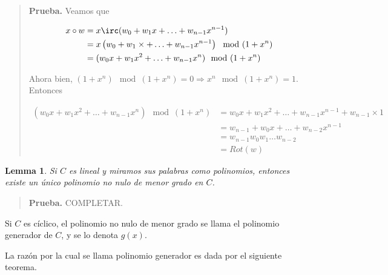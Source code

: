 \documentclass[a4paper]{article}
\newtheorem{lemma}{Lemma}
\newtheorem{lemma}{Lemma}
\begin{document}
\small
\begin{quote}

\textbf{Prueba.} Veamos que 

\begin{align*}
    x \circ w &= x \irc (w_0 + w_1x + \ldots + w_{n-1}x^{n-1}) \\ 
              &=x \left( w_0 + w_1\times  + \ldots + w_{n-1}x^{n-1} \right) \mod (1 + x^n) \\ 
              &= (w_0 x + w_1x^2 + \ldots + w_{n-1}x^n) \mod (1 + x^n)
\end{align*}

Ahora bien, $(1+x^n) \mod (1 + x^n) = 0 \Rightarrow x^n \mod (1 + x^n) = 1$. Entonces 

\begin{align*}
    
    (w_0 x + w_1x^2 + \ldots + w_{n-1}x^n) \mod (1 + x^n) &= w_0 x + w_1x^2 + \ldots + w_{n-1}x^{n-1} + w_{n-1} \times 1 \\ 
                                                          &=w_{n-1} + w_0 x + \ldots + w_{n-2} x^{n-1} \\ 
                                                          &= w_{n-1} w_0 w_1 \ldots w_{n-2} \\ 
                                                        &= Rot(w)
\end{align*}

\end{quote}
\normalsize


\begin{lemma}
    Si $C$ es lineal y miramos sus palabras como polinomios, entonces existe un 
    único polinomio no nulo de menor grado en $C$.
\end{lemma}



\small
\begin{quote}

\textbf{Prueba.} COMPLETAR.

\end{quote}
\normalsize

\begin{definition}
    Si $C$ es cíclico, el polinomio no nulo de menor grado se llama 
    el polinomio generador de $C$, y se lo denota $g(x)$.
\end{definition}

La razón por la cual se llama polinomio generador es dada por el siguiente teorema.
\end{document}
